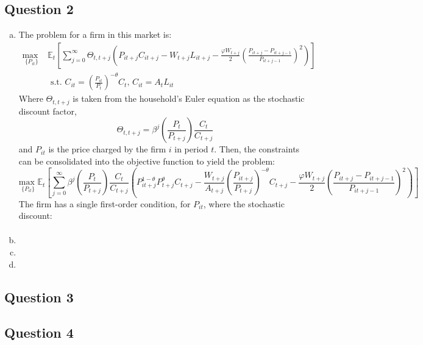 \documentclass{article}
\newcommand{\usmax}[1]{\underset{#1}{\text{max }}}
\newcommand{\Et}[1]{\mathbb{E}_t\left[#1\right]}
\begin{document}

\subsection*{Question 2}

\begin{enumerate}[(a)]

	\item The problem for a firm in this market is:
		{\small \begin{align*}
			\usmax{\{P_{it}\}}&\Et{\sum_{j=0}^\infty\Theta_{t,t+j}\left(P_{it+j}C_{it+j}-W_{t+j}L_{it+j} - \frac{\varphi W_{t+j}}{2}\left(\frac{P_{it+j}-P_{it+j-1}}{P_{it+j-1}}\right)^2\right)}	\\
				&\text{ s.t. } C_{it} = \left(\frac{P_{it}}{P_t}\right)^{-\theta}C_t\text{, }C_{it}=A_tL_{it}
		\end{align*} }
		Where $\Theta_{t,t+j}$ is taken from the household's Euler equation as the stochastic discount factor,
		\[
			\Theta_{t,t+j} = \beta^j\left(\frac{P_t}{P_{t+j}}\right)\frac{C_t}{C_{t+j}}
		\]
		and $P_{it}$ is the price charged by the firm $i$ in period $t$. Then, the constraints can be consolidated into the objective function to yield the problem:
		{\tiny \[
			\usmax{\{P_{it}\}}\Et{\sum_{j=0}^\infty\beta^j\left(\frac{P_t}{P_{t+j}}\right)\frac{C_t}{C_{t+j}}
				\left(P_{it+j}^{1-\theta}P_{t+j}^\theta C_{t+j}-\frac{W_{t+j}}{A_{t+j}}\left(\frac{P_{it+j}}{P_{t+j}}\right)^{-\theta}C_{t+j}-\frac{\varphi W_{t+j}}{2}\left(\frac{P_{it+j}-P_{it+j-1}}{P_{it+j-1}}\right)^2\right)}
		\] }
		The firm has a single first-order condition, for $P_{it}$, where the stochastic discount:
		\begin{align*}
			[something complicated]
		\end{align*}
		
	\item
	
	\item 
	
	\item 
	
	
\end{enumerate}




\subsection*{Question 3}





\subsection*{Question 4}





\end{document}
